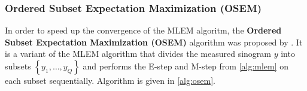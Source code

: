 
\subsubsection{Ordered Subset Expectation Maximization (OSEM)}

In order to speed up the convergence of the MLEM algoritm,
the \textbf{Ordered Subset Expectation Maximization (OSEM)} algorithm was proposed by \cite{Hudson1994}. It is a variant of the MLEM algorithm that divides the measured sinogram $y$ into subsets $\left\{y_1, \hdots, y_Q\right\}$ and performs the E-step and M-step from \ref{alg:mlem} on each subset sequentially. Algorithm is given in \ref{alg:osem}.

